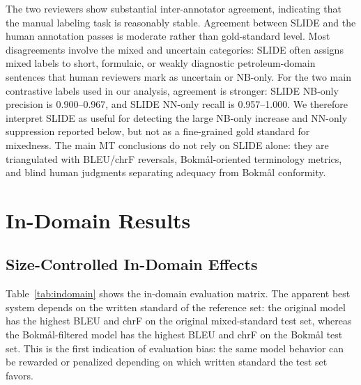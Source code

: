 \documentclass[11pt]{article}
\newcommand{\nb}{Bokm{\aa}l}
\begin{document}
The two reviewers show substantial inter-annotator agreement, indicating that the manual labeling task is reasonably stable. Agreement between SLIDE and the human annotation passes is moderate rather than gold-standard level. Most disagreements involve the mixed and uncertain categories: SLIDE often assigns mixed labels to short, formulaic, or weakly diagnostic petroleum-domain sentences that human reviewers mark as uncertain or NB-only. For the two main contrastive labels used in our analysis, agreement is stronger: SLIDE NB-only precision is 0.900--0.967, and SLIDE NN-only recall is 0.957--1.000. We therefore interpret SLIDE as useful for detecting the large NB-only increase and NN-only suppression reported below, but not as a fine-grained gold standard for mixedness. The main MT conclusions do not rely on SLIDE alone: they are triangulated with BLEU/chrF reversals, \nb{}-oriented terminology metrics, and blind human judgments separating adequacy from \nb{} conformity.

\section{In-Domain Results}

\subsection{Size-Controlled In-Domain Effects}

Table~\ref{tab:indomain} shows the in-domain evaluation matrix. The apparent best system depends on the written standard of the reference set: the original model has the highest BLEU and chrF on the original mixed-standard test set, whereas the \nb{}-filtered model has the highest BLEU and chrF on the \nb{} test set. This is the first indication of evaluation bias: the same model behavior can be rewarded or penalized depending on which written standard the test set favors.
\end{document}
